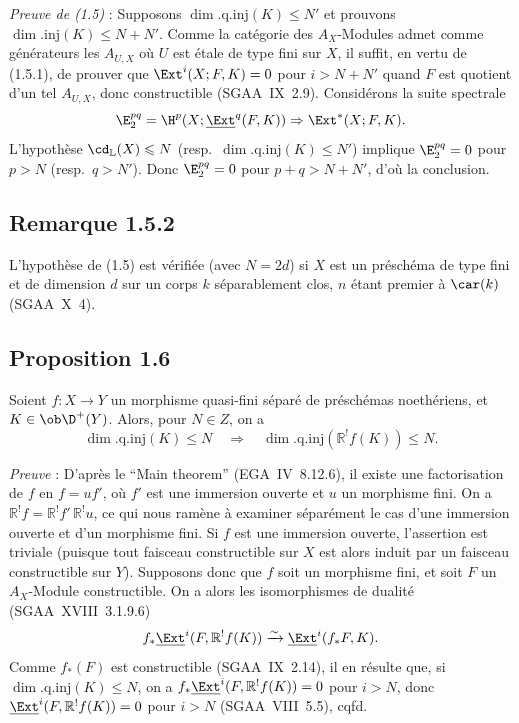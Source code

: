 \emph{Preuve de (1.5)} : Supposons $\dim.\mathrm{q.inj}(K) \leqslant N'$ et prouvons $\dim.\mathrm{inj}(K) \leqslant N + N'$. Comme la catégorie des $A_X$-Modules admet comme générateurs les $A_{U,X}$ où $U$ est étale de type fini sur $X$, il suffit, en vertu de (1.5.1), de prouver que $\Ext^i(X; F,K) = 0$ pour $i > N + N'$ quand $F$ est quotient d'un tel $A_{U,X}$, donc constructible (SGAA~IX~2.9). Considérons la suite spectrale
\[
\E_2^{pq} = \H^p(X; \underline{\Ext}^q(F,K)) \Rightarrow \Ext^{*}(X; F,K).
\]
L'hypothèse $\cd_{\mathbb{L}}(X) \leqslant N$ (resp.~$\dim.\mathrm{q.inj}(K) \leqslant N'$) implique $\E_2^{pq} = 0$ pour $p > N$ (resp.~$q > N'$). Donc $\E_2^{pq} = 0$ pour $p+q > N+N'$, d'où la conclusion.

\subsection*{Remarque 1.5.2}
L'hypothèse de (1.5) est vérifiée (avec $N = 2d$) si $X$ est un préschéma de type fini et de dimension $d$ sur un corps $k$ séparablement clos, $n$ étant premier à $\car(k)$ (SGAA~X~4).

\subsection*{Proposition 1.6}
Soient $f : X \to Y$ un morphisme quasi-fini séparé de préschémas noethériens, et $K \in \ob \D^{+}(Y)$. Alors, pour $N \in Z$, on a
\[
\dim.\mathrm{q.inj}(K) \leqslant N \quad \Longrightarrow \quad \dim.\mathrm{q.inj}(\mathbb{R}^{!}f(K)) \leqslant N.
\]

\emph{Preuve} : D'après le ``Main theorem'' (EGA~IV~8.12.6), il existe une factorisation de $f$ en $f = uf'$, où $f'$ est une immersion ouverte et $u$ un morphisme fini. On a $\mathbb{R}^{!}f = \mathbb{R}^{!}f' \, \mathbb{R}^{!}u$, ce qui nous ramène à examiner séparément le cas d'une immersion ouverte et d'un morphisme fini. Si $f$ est une immersion ouverte, l'assertion est triviale (puisque tout faisceau constructible sur $X$ est alors induit par un faisceau constructible sur $Y$). Supposons donc que $f$ soit un morphisme fini, et soit $F$ un $A_X$-Module constructible. On a alors les isomorphismes de dualité (SGAA~XVIII~3.1.9.6)
\[
f_{*}\underline{\Ext}^i(F, \mathbb{R}^{!}f(K)) \xrightarrow{\sim} \underline{\Ext}^i(f_{*}F, K).
\]
Comme $f_{*}(F)$ est constructible (SGAA~IX~2.14), il en résulte que, si $\dim.\mathrm{q.inj}(K) \leqslant N$, on a $f_{*}\underline{\Ext}^i(F, \mathbb{R}^{!}f(K)) = 0$ pour $i > N$, donc $\underline{\Ext}^i(F, \mathbb{R}^{!}f(K)) = 0$ pour $i > N$ (SGAA~VIII~5.5), cqfd.

